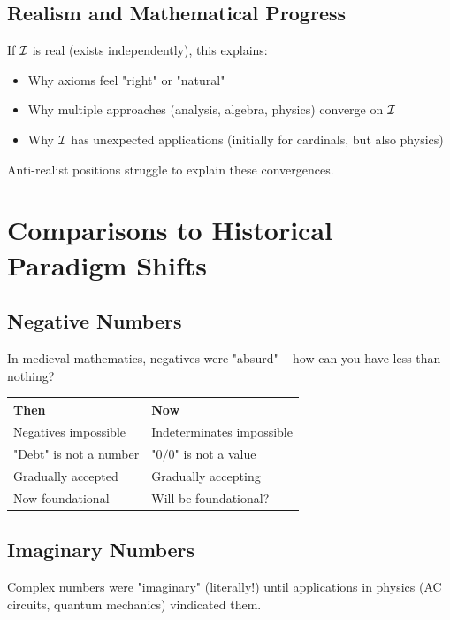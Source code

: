 \subsection{Realism and Mathematical Progress}

\begin{theorem}
If $\mathcal{I}$ is real (exists independently), this explains:
\begin{itemize}
    \item Why axioms feel "right" or "natural"
    \item Why multiple approaches (analysis, algebra, physics) converge on $\mathcal{I}$
    \item Why $\mathcal{I}$ has unexpected applications (initially for cardinals, but also physics)
\end{itemize}
\end{theorem}

Anti-realist positions struggle to explain these convergences.

\section{Comparisons to Historical Paradigm Shifts}

\subsection{Negative Numbers}

In medieval mathematics, negatives were "absurd" -- how can you have less than nothing?

\begin{center}
\begin{tabular}{|l|l|}
\hline
\textbf{Then} & \textbf{Now} \\
\hline
Negatives impossible & Indeterminates impossible \\
"Debt" is not a number & "$0/0$" is not a value \\
Gradually accepted & Gradually accepting \\
Now foundational & Will be foundational? \\
\hline
\end{tabular}
\end{center}

\subsection{Imaginary Numbers}

Complex numbers were "imaginary" (literally!) until applications in physics (AC circuits, quantum mechanics) vindicated them.

